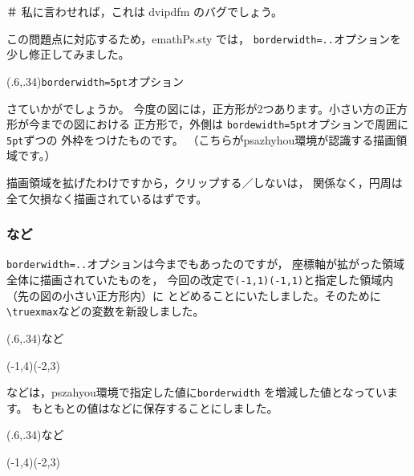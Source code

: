 \documentclass[a4j]{jarticle}
\begin{document}
＃ 私に言わせれば，これは dvipdfm のバグでしょう。

この問題点に対応するため，\textsf{emathPs.sty} では，
\texttt{borderwidth=..}オプションを少し修正してみました。

\begin{showEx}(.6,.34){\texttt{borderwidth=5pt}オプション}
\smallskip
{}
\smallskip
\end{showEx}

さていかがでしょうか。
今度の図には，正方形が2つあります。小さい方の正方形が今までの図における
正方形で，外側は \texttt{bordewidth=5pt}オプションで周囲に\texttt{5pt}ずつの
外枠をつけたものです。
（こちらが\textsf{psazhyhou}環境が認識する描画領域です。）

描画領域を拡げたわけですから，クリップする／しないは，
関係なく，円周は全て欠損なく描画されているはずです。
\pagebreak

\subsubsection{\texorpdfstring{}{truexmax}など}
\texttt{borderwidth=..}オプションは今までもあったのですが，
座標軸が拡がった領域全体に描画されていたものを，
今回の改定で\verb+(-1,1)(-1,1)+と指定した領域内（先の図の小さい正方形内）に
とどめることにいたしました。そのために
\verb+\truexmax+などの変数を新設しました。

\begin{showEx}(.6,.34){など}
\smallskip
\begin{pszahyou*}[ul=5mm,borderwidth=5pt]%
      (-1,4)(-2,3)
  \Kuromaru\A
  \Put{}
\end{pszahyou*}
\end{showEx}

などは，\textsf{pszahyou}環境で指定した値に\texttt{borderwidth}
を増減した値となっています。
もともとの値はなどに保存することにしました。

\begin{showEx}(.6,.34){など}
\smallskip
\begin{pszahyou*}[ul=5mm,borderwidth=5pt]%
      (-1,4)(-2,3)
  \Kuromaru\A
  \Put{}
\end{pszahyou*}
\end{showEx}
\pagebreak
\end{document}

